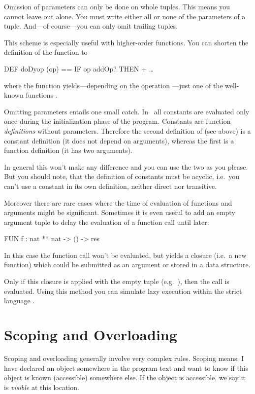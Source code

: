  Omission of parameters can only be done on whole tuples.
This means you cannot leave out  alone. You must write
either all or none of the parameters of a tuple.
And---of course---you can only omit trailing tuples.

\medskip
This scheme is especially useful with higher-order functions. 
You can shorten the definition of the function  to  
\begin{prog}
        DEF doDyop (op) == IF op addOp? THEN +
                           \dots 
\end{prog}
where the function yields---depending on the operation ---just
one of the well-known functions \pro{+, -, *, /}.

\experienced
Omitting parameters entails one small catch.
In \opal\ all constants are evaluated only once during the initialization
phase of the program. 
Constants are  function {\em definitions\/} without parameters. 
Therefore the second definition of  (see above) is a
constant definition (it does not depend on arguments), whereas the
first is a function definition (it has two arguments).

In general this won't make any difference and you can use the two as
you please.
 But you should note, that the definition of constants
must be acyclic, i.e.~you can't use a constant in its own definition,
neither direct nor transitive.

Moreover there are rare cases where the time of evaluation of
functions and arguments might be significant.
Sometimes it is even useful to add an empty argument tuple to delay
the evaluation of a function call until later:
\begin{prog}
        FUN f : nat ** nat -> () -> res
\end{prog}
In this case the function call  won't be
evaluated, but yields a closure (i.e.~a new function) which could be
submitted  as an argument or stored in a data structure.

Only if this closure is applied with the empty tuple (e.g.~), then
the call   is evaluated.
Using this method you can simulate lazy execution within the strict
language \opal.


\section{Scoping and Overloading}
\label{sec:scope}
\novice
Scoping and overloading generally involve very complex rules.
Scoping means: I have declared an object somewhere in  the
program text and want to know if this object is known (accessible)
somewhere else.
If the object is accessible, we say it is {\em visible\/} at this
location.

